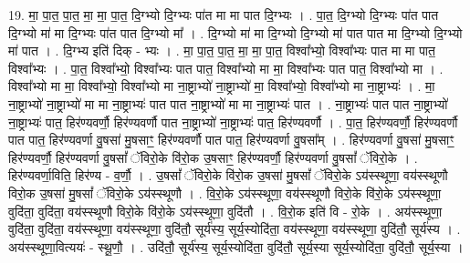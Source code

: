 \documentclass[17pt]{extarticle}
\begin{document}
19. मा॒ पा॒त॒ पा॒त॒ मा॒ मा॒ पा॒त॒ दि॒ग्भ्यो दि॒ग्भ्यः पा॑त मा मा पात दि॒ग्भ्यः । . पा॒त॒ दि॒ग्भ्यो दि॒ग्भ्यः पा॑त पात दि॒ग्भ्यो मा॑ मा दि॒ग्भ्यः पा॑त पात दि॒ग्भ्यो मा᳚ । . दि॒ग्भ्यो मा॑ मा दि॒ग्भ्यो दि॒ग्भ्यो मा॑ पात पात मा दि॒ग्भ्यो दि॒ग्भ्यो मा॑ पात । . दि॒ग्भ्य इति॑ दिक् - भ्यः । . मा॒ पा॒त॒ पा॒त॒ मा॒ मा॒ पा॒त॒ विश्वा᳚भ्यो॒ विश्वा᳚भ्यः पात मा मा पात॒ विश्वा᳚भ्यः । . पा॒त॒ विश्वा᳚भ्यो॒ विश्वा᳚भ्यः पात पात॒ विश्वा᳚भ्यो मा मा॒ विश्वा᳚भ्यः पात पात॒ विश्वा᳚भ्यो मा । . विश्वा᳚भ्यो मा मा॒ विश्वा᳚भ्यो॒ विश्वा᳚भ्यो मा ना॒ष्ट्राभ्यो॑ ना॒ष्ट्राभ्यो॑ मा॒ विश्वा᳚भ्यो॒ विश्वा᳚भ्यो मा ना॒ष्ट्राभ्यः॑ । . मा॒ ना॒ष्ट्राभ्यो॑ ना॒ष्ट्राभ्यो॑ मा मा ना॒ष्ट्राभ्यः॑ पात पात ना॒ष्ट्राभ्यो॑ मा मा ना॒ष्ट्राभ्यः॑ पात । . ना॒ष्ट्राभ्यः॑ पात पात ना॒ष्ट्राभ्यो॑ ना॒ष्ट्राभ्यः॑ पात॒ हिर॑ण्यवर्णौ॒ हिर॑ण्यवर्णौ पात ना॒ष्ट्राभ्यो॑ ना॒ष्ट्राभ्यः॑ पात॒ हिर॑ण्यवर्णौ । . पा॒त॒ हिर॑ण्यवर्णौ॒ हिर॑ण्यवर्णौ पात पात॒ हिर॑ण्यवर्णा वु॒षसा॑ मु॒षसाꣳ॒॒ हिर॑ण्यवर्णौ पात पात॒ हिर॑ण्यवर्णा वु॒षसा᳚म् । . हिर॑ण्यवर्णा वु॒षसा॑ मु॒षसाꣳ॒॒ हिर॑ण्यवर्णौ॒ हिर॑ण्यवर्णा वु॒षसां᳚ ॅविरो॒के वि॑रो॒क उ॒षसाꣳ॒॒ हिर॑ण्यवर्णौ॒ हिर॑ण्यवर्णा वु॒षसां᳚ ॅविरो॒के । . हिर॑ण्यवर्णा॒विति॒ हिर॑ण्य - व॒र्णौ॒ । . उ॒षसां᳚ ॅविरो॒के वि॑रो॒क उ॒षसा॑ मु॒षसां᳚ ॅविरो॒के ऽय॑स्स्थूणा॒ वय॑स्स्थूणौ विरो॒क उ॒षसा॑ मु॒षसां᳚ ॅविरो॒के ऽय॑स्स्थूणौ । . वि॒रो॒के ऽय॑स्स्थूणा॒ वय॑स्स्थूणौ विरो॒के वि॑रो॒के ऽय॑स्स्थूणा॒ वुदि॑ता॒ वुदि॑ता॒ वय॑स्स्थूणौ विरो॒के वि॑रो॒के ऽय॑स्स्थूणा॒ वुदि॑तौ । . वि॒रो॒क इति॑ वि - रो॒के । . अय॑स्स्थूणा॒ वुदि॑ता॒ वुदि॑ता॒ वय॑स्स्थूणा॒ वय॑स्स्थूणा॒ वुदि॑तौ॒ सूर्य॑स्य॒ सूर्य॒स्योदि॑ता॒ वय॑स्स्थूणा॒ वय॑स्स्थूणा॒ वुदि॑तौ॒ सूर्य॑स्य । . अय॑स्स्थूणा॒वित्ययः॑ - स्थू॒णौ॒ । . उदि॑तौ॒ सूर्य॑स्य॒ सूर्य॒स्योदि॑ता॒ वुदि॑तौ॒ सूर्य॒स्या सूर्य॒स्योदि॑ता॒ वुदि॑तौ॒ सूर्य॒स्या । \newline
\end{document}
